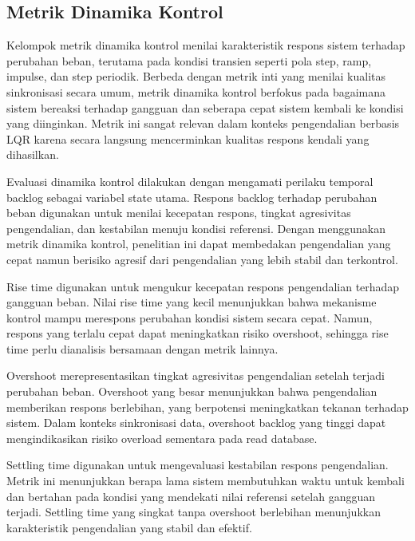 \subsection{Metrik Dinamika Kontrol}

Kelompok metrik dinamika kontrol menilai karakteristik respons sistem terhadap perubahan beban, terutama pada kondisi transien seperti pola step, ramp, impulse, dan step periodik.
Berbeda dengan metrik inti yang menilai kualitas sinkronisasi secara umum, metrik dinamika kontrol berfokus pada bagaimana sistem bereaksi terhadap gangguan dan seberapa cepat sistem kembali ke kondisi yang diinginkan.
Metrik ini sangat relevan dalam konteks pengendalian berbasis LQR karena secara langsung mencerminkan kualitas respons kendali yang dihasilkan.

Evaluasi dinamika kontrol dilakukan dengan mengamati perilaku temporal backlog sebagai variabel state utama.
Respons backlog terhadap perubahan beban digunakan untuk menilai kecepatan respons, tingkat agresivitas pengendalian, dan kestabilan menuju kondisi referensi.
Dengan menggunakan metrik dinamika kontrol, penelitian ini dapat membedakan pengendalian yang cepat namun berisiko agresif dari pengendalian yang lebih stabil dan terkontrol.

Rise time digunakan untuk mengukur kecepatan respons pengendalian terhadap gangguan beban.
Nilai rise time yang kecil menunjukkan bahwa mekanisme kontrol mampu merespons perubahan kondisi sistem secara cepat.
Namun, respons yang terlalu cepat dapat meningkatkan risiko overshoot, sehingga rise time perlu dianalisis bersamaan dengan metrik lainnya.

Overshoot merepresentasikan tingkat agresivitas pengendalian setelah terjadi perubahan beban.
Overshoot yang besar menunjukkan bahwa pengendalian memberikan respons berlebihan, yang berpotensi meningkatkan tekanan terhadap sistem.
Dalam konteks sinkronisasi data, overshoot backlog yang tinggi dapat mengindikasikan risiko overload sementara pada read database.

Settling time digunakan untuk mengevaluasi kestabilan respons pengendalian.
Metrik ini menunjukkan berapa lama sistem membutuhkan waktu untuk kembali dan bertahan pada kondisi yang mendekati nilai referensi setelah gangguan terjadi.
Settling time yang singkat tanpa overshoot berlebihan menunjukkan karakteristik pengendalian yang stabil dan efektif.

